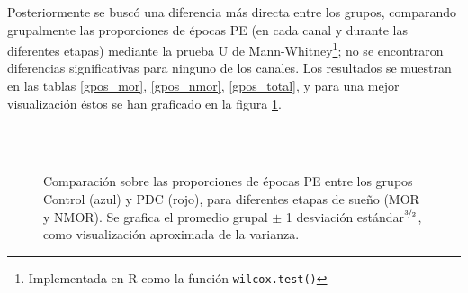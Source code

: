 \documentclass[12pt,a4paper]{mitthesis}
\begin{document}
Posteriormente se busc\'o una diferencia m\'as directa entre los grupos, comparando grupalmente las 
proporciones de \'epocas PE (en cada canal y durante las diferentes etapas)
mediante la prueba U de Mann-Whitney\footnote{Implementada en R como la funci\'on 
\texttt{wilcox.test()}};
no se encontraron diferencias significativas para ninguno de los canales. Los resultados se 
muestran en las tablas \ref{gpos_mor}, \ref{gpos_nmor}, \ref{gpos_total}, y para una mejor 
visualizaci\'on \'estos se han graficado en la figura \ref{comparacion_graf}.

\begin{figure}
\centering
{}\\
\\
\caption{Comparaci\'on sobre las proporciones de \'epocas PE entre los grupos Control (azul) y PDC 
(rojo), para diferentes etapas de sue\~no (MOR y NMOR). Se grafica el promedio grupal $\pm$ 1 
desviaci\'on est\'andar$^{\nicefrac{3}{2}}$, como visualizaci\'on aproximada de la varianza.}
\label{comparacion_graf}
\end{figure}
\end{document}
